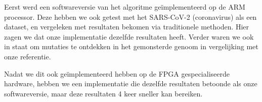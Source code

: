 Eerst werd een softwareversie van het algoritme ge\"implementeerd op de ARM processor. Deze hebben we ook getest met het SARS-CoV-2 (coronavirus) als een dataset, en vergeleken met resultaten bekomen via traditionele methoden. Hier zagen we dat onze implementatie dezelfde resultaten heeft. Verder waren we ook in staat om mutaties te ontdekken in het gemonsterde genoom in vergelijking met onze referentie.

Nadat we dit ook ge\"implementeerd hebben op de FPGA gespecialiseerde hardware, hebben we een implementatie die dezelfde resultaten betoonde als onze softwareversie, maar deze resultaten 4 keer sneller kan bereiken.